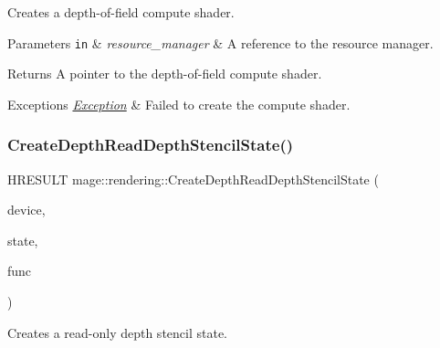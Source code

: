 Creates a depth-\/of-\/field compute shader.


\begin{DoxyParams}[1]{Parameters}
\mbox{\tt in}  & {\em resource\+\_\+manager} & A reference to the resource manager. \\
\hline
\end{DoxyParams}
\begin{DoxyReturn}{Returns}
A pointer to the depth-\/of-\/field compute shader. 
\end{DoxyReturn}

\begin{DoxyExceptions}{Exceptions}
{\em \mbox{\hyperlink{classmage_1_1_exception}{Exception}}} & Failed to create the compute shader. \\
\hline
\end{DoxyExceptions}
\mbox{\label{namespacemage_1_1rendering_ae95b42c9a5b31ea08e13b654e0b50742}} 
\subsubsection{\texorpdfstring{Create\+Depth\+Read\+Depth\+Stencil\+State()}{CreateDepthReadDepthStencilState()}}
{\footnotesize\ttfamily H\+R\+E\+S\+U\+LT mage\+::rendering\+::\+Create\+Depth\+Read\+Depth\+Stencil\+State (\begin{DoxyParamCaption}\item[{I\+D3\+D11\+Device \&}]{device,  }\item[{\mbox{\hyperlink{namespacemage_a8769f9d670d6b585ea306cb1062af94b}{Not\+Null}}$<$ I\+D3\+D11\+Depth\+Stencil\+State $\ast$$\ast$$>$}]{state,  }\item[{D3\+D11\+\_\+\+C\+O\+M\+P\+A\+R\+I\+S\+O\+N\+\_\+\+F\+U\+NC}]{func }\end{DoxyParamCaption})\hspace{0.3cm}{\ttfamily [noexcept]}}

Creates a read-\/only depth stencil state.


